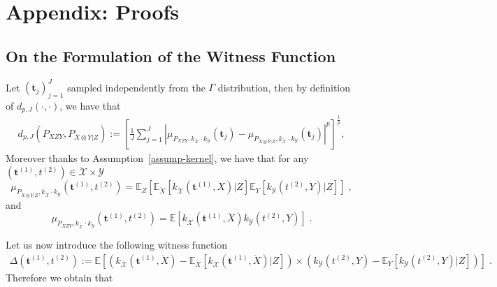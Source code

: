 \section{Appendix: Proofs}
\subsection{On the Formulation of the Witness Function}
\label{form-witness}
Let $(\mathbf{t}_j)_{j=1}^J$ sampled independently from the $\Gamma$ distribution, then by definition of $d_{p,J}(\cdot,\cdot)$, we have that
\begin{align*}
\label{eq-dlp_J}
    d_{p,J}(P_{XZY},P_{\ddot{X}\otimes Y|Z}):=\left[\frac{1}{J}\sum_{j=1}^J \left|\mu_{P_{XZY},k_{\mathcal{\ddot{X}}}\cdot k_{\mathcal{Y}}}(\mathbf{t}_j)-\mu_{P_{\ddot{X}\otimes Y|Z},k_{\mathcal{\ddot{X}}}\cdot k_{\mathcal{Y}}}(\mathbf{t}_j)\right|^p\right]^{\frac{1}{p}},
\end{align*}
Moreover thanks to Assumption~\ref{assump-kernel}, we have that for any $(\mathbf{t}^{(1)},t^{(2)})\in\mathcal{\ddot{X}}\times\mathcal{Y}$ 
\begin{equation*}
    \mu_{P_{\ddot{X}\otimes Y|Z},k_{\mathcal{\ddot{X}}}\cdot k_{\mathcal{Y}}}(\mathbf{t}^{(1)},t^{(2)})=
    \mathbb{E}_{Z}\left[\mathbb{E}_{\ddot{X}}\left[k_{\mathcal{\ddot{X}}}(\mathbf{t}^{(1)},\ddot{X})|Z\right]
    \mathbb{E}_{Y}\left[k_{\mathcal{Y}}(t^{(2)},Y)|Z\right] \right]\; ,
\end{equation*}
and 
\begin{equation*}
    \mu_{P_{XZY},k_{\mathcal{\ddot{X}}}\cdot k_{\mathcal{Y}}}(\mathbf{t}^{(1)},t^{(2)})=
    \mathbb{E}\left[k_{\mathcal{\ddot{X}}}(\mathbf{t}^{(1)},\ddot{X})
 k_{\mathcal{Y}}(t^{(2)},Y) \right]\; .
\end{equation*}


Let us now introduce the following witness function
\begin{align*}
    \Delta(\mathbf{t}^{(1)},t^{(2)}) :=\mathbb{E}\left[\left(k_{\mathcal{\ddot{X}}}(\mathbf{t}^{(1)},\ddot{X})- \mathbb{E}_{\ddot{X}}\left[k_{\mathcal{\ddot{X}}}(\mathbf{t}^{(1)},\ddot{X})|Z\right]\right)\times\left(k_{\mathcal{Y}}(t^{(2)},Y)- \mathbb{E}_{Y}\left[k_{\mathcal{Y}}(t^{(2)},Y)|Z\right]\right)\right]\;.
\end{align*}
Therefore we obtain that

